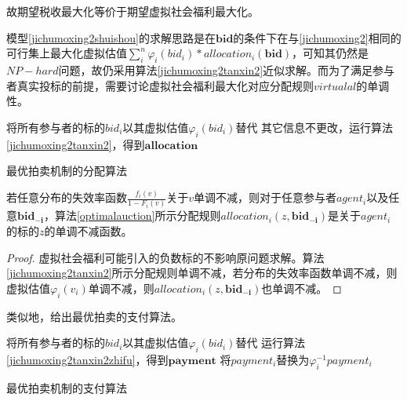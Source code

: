 \documentclass[promaster]{thesis-uestc}
\begin{document}
故期望税收最大化等价于期望虚拟社会福利最大化。

模型\ref{jichumoxing2shuishou}的求解思路是在$\mathbf{bid}$的条件下在与\ref{jichumoxing2}相同的可行集上最大化虚拟估值$\sum_{i}^{n}{\varphi _i(bid_i)*allocation_i(\mathbf{bid})}$，可知其仍然是$NP-hard$问题，故仍采用算法\ref{jichumoxing2tanxin2}近似求解。而为了满足参与者真实投标的前提，需要讨论虚拟社会福利最大化对应分配规则$virtualal$的单调性。

\begin{algorithm}[H] 
    将所有参与者的标的$bid_i$以其虚拟估值$\varphi _i(bid_i)$替代\;
    其它信息不更改，运行算法\ref{jichumoxing2tanxin2}，得到$\mathbf{allocation}$\;
\caption{最优拍卖机制的分配算法}
\label{optimalauction}
\end{algorithm}

\begin{theorem}
若任意分布的失效率函数$\frac{f_i(v)}{1-F_i(v)}$关于$v$单调不减，则对于任意参与者$agent_i$以及任意$\mathbf{bid_{-i}}$，算法\ref{optimalauction}所示分配规则$allocation_i(z,\mathbf{bid_{-i}})$是关于$agent_i$的标的$z$的单调不减函数。
\end{theorem}

\begin{proof}
虚拟社会福利可能引入的负数标的不影响原问题求解。算法\ref{jichumoxing2tanxin2}所示分配规则单调不减，若分布的失效率函数单调不减，则虚拟估值$\varphi _i(v_i)$单调不减，则$allocation_i(z,\mathbf{bid_{-i}})$也单调不减。
\end{proof}

类似地，给出最优拍卖的支付算法。

\begin{algorithm}[H] 
    将所有参与者的标的$bid_i$以其虚拟估值$\varphi _i(bid_i)$替代\;
    运行算法\ref{jichumoxing2tanxin2zhifu}，得到$\mathbf{payment}$\;
    {
        将$payment_i$替换为$\varphi _{i}^{-1}{payment_i}$
    }
\caption{最优拍卖机制的支付算法}
\label{optimalauctionzhifu}
\end{algorithm}

\FloatBarrier


\end{document}
